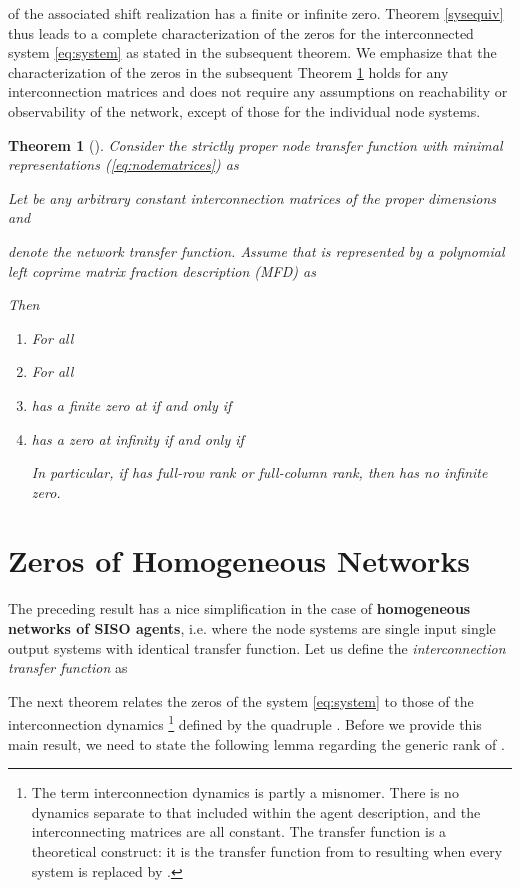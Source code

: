 \documentclass[twocolumn]{autart}    \usepackage{amsmath}
\newtheorem{theorem}{Theorem}
\begin{document}
of the associated shift realization
 has a finite or infinite
 zero. Theorem \ref{sysequiv} thus leads to a complete
 characterization
 of the zeros for the interconnected system \eqref{eq:system}  as stated in the subsequent theorem.  We emphasize that the characterization of the zeros in the
 subsequent Theorem \ref{MAINA}
holds for any interconnection matrices and does not require any assumptions on reachability or observability of
the network, except of those for the individual  node systems.\\

\begin{theorem}[\cite{fuhe2013}]
\label{MAINA}
Consider the strictly proper   node transfer function  with
minimal representations (\ref{eq:nodematrices}) as

Let  be any arbitrary constant interconnection matrices of the proper dimensions and

denote the network transfer function.
Assume that  is represented by  a polynomial left coprime matrix fraction
description (MFD) as



 Then
\begin{enumerate}
\item For all 


 \item For all 
 
\item
 has a finite zero at  if and only if





\item  has a zero at infinity if and only if

In particular, if  has full-row rank or full-column rank, then  has no infinite zero.
 \end{enumerate}
\end{theorem}


\section{Zeros of Homogeneous Networks}\label{sec:homog}

The preceding result has a nice simplification in the case of
\textbf{homogeneous networks  of SISO agents}, i.e. where the node systems  are single input single output systems with identical transfer function.  Let us define the  {\it interconnection transfer function} as
 

The next theorem relates the zeros of the system \eqref{eq:system} to those of the interconnection dynamics \footnote{The term interconnection dynamics
is partly a misnomer. There is no dynamics separate to that included within the agent description, and the interconnecting matrices are all constant. The transfer function  is a theoretical construct: it is the transfer function from  to  resulting when every system is replaced by .} defined by the quadruple . Before we provide this main result, we need to state the following lemma regarding the generic rank of .
\end{document}
